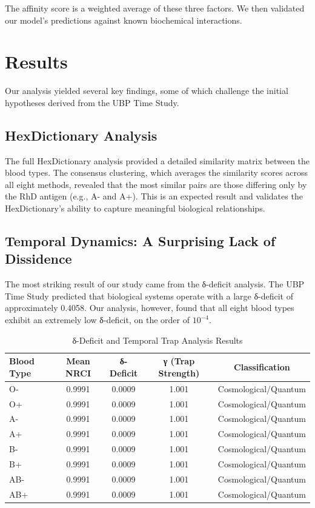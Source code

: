 \documentclass{article}
\begin{document}
The affinity score is a weighted average of these three factors. We then validated our model's predictions against known biochemical interactions.

\section{Results}

Our analysis yielded several key findings, some of which challenge the initial hypotheses derived from the UBP Time Study.

\subsection{HexDictionary Analysis}

The full HexDictionary analysis provided a detailed similarity matrix between the blood types. The consensus clustering, which averages the similarity scores across all eight methods, revealed that the most similar pairs are those differing only by the RhD antigen (e.g., A- and A+). This is an expected result and validates the HexDictionary's ability to capture meaningful biological relationships.

\subsection{Temporal Dynamics: A Surprising Lack of Dissidence}

The most striking result of our study came from the δ-deficit analysis. The UBP Time Study predicted that biological systems operate with a large δ-deficit of approximately 0.4058. Our analysis, however, found that all eight blood types exhibit an extremely low δ-deficit, on the order of $10^{-4}$.

\begin{table}[h!]
\centering
\caption{δ-Deficit and Temporal Trap Analysis Results}
\begin{tabular}{lcccc}
\toprule
\textbf{Blood Type} & \textbf{Mean NRCI} & \textbf{δ-Deficit} & \textbf{γ (Trap Strength)} & \textbf{Classification} \\
\midrule
O-  & 0.9991 & 0.0009 & 1.001 & Cosmological/Quantum \\
O+  & 0.9991 & 0.0009 & 1.001 & Cosmological/Quantum \\
A-  & 0.9991 & 0.0009 & 1.001 & Cosmological/Quantum \\
A+  & 0.9991 & 0.0009 & 1.001 & Cosmological/Quantum \\
B-  & 0.9991 & 0.0009 & 1.001 & Cosmological/Quantum \\
B+  & 0.9991 & 0.0009 & 1.001 & Cosmological/Quantum \\
AB- & 0.9991 & 0.0009 & 1.001 & Cosmological/Quantum \\
AB+ & 0.9991 & 0.0009 & 1.001 & Cosmological/Quantum \\
\bottomrule
\end{tabular}
\label{tab:delta_results}
\end{table}
\end{document}

